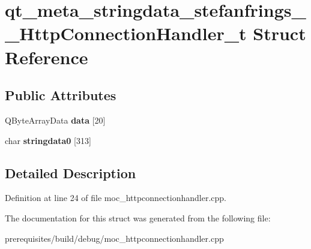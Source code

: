 \hypertarget{structqt__meta__stringdata__stefanfrings_____http_connection_handler__t}{}\section{qt\+\_\+meta\+\_\+stringdata\+\_\+stefanfrings\+\_\+\+\_\+\+Http\+Connection\+Handler\+\_\+t Struct Reference}
\label{structqt__meta__stringdata__stefanfrings_____http_connection_handler__t}
\subsection*{Public Attributes}
\begin{DoxyCompactItemize}
\item 
\mbox{\label{structqt__meta__stringdata__stefanfrings_____http_connection_handler__t_ad7d3aa4962d33cf2c6c6eed3b08986f0}} 
Q\+Byte\+Array\+Data {\bfseries data} \mbox{[}20\mbox{]}
\item 
\mbox{\label{structqt__meta__stringdata__stefanfrings_____http_connection_handler__t_ad052aa383b005d97e82e265deec27ce4}} 
char {\bfseries stringdata0} \mbox{[}313\mbox{]}
\end{DoxyCompactItemize}


\subsection{Detailed Description}


Definition at line 24 of file moc\+\_\+httpconnectionhandler.\+cpp.



The documentation for this struct was generated from the following file\+:\begin{DoxyCompactItemize}
\item 
prerequisites/build/debug/moc\+\_\+httpconnectionhandler.\+cpp\end{DoxyCompactItemize}
